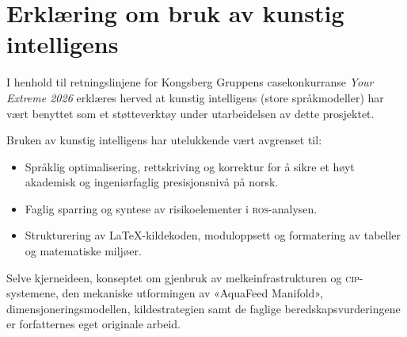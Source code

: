 \section*{Erklæring om bruk av kunstig intelligens}

I henhold til retningslinjene for Kongsberg Gruppens casekonkurranse \textit{Your Extreme 2026} erklæres herved at kunstig intelligens (store språkmodeller) har vært benyttet som et støtteverktøy under utarbeidelsen av dette prosjektet. 

Bruken av kunstig intelligens har utelukkende vært avgrenset til:
\begin{itemize}[leftmargin=1.5em, itemsep=0.2em]
    \item Språklig optimalisering, rettskriving og korrektur for å sikre et høyt akademisk og ingeniørfaglig presisjonsnivå på norsk.
    \item Faglig sparring og syntese av risikoelementer i \textsc{ros}-analysen.
    \item Strukturering av \LaTeX-kildekoden, moduloppsett og formatering av tabeller og matematiske miljøer.
\end{itemize}

Selve kjerneideen, konseptet om gjenbruk av melkeinfrastrukturen og \textsc{cip}-systemene, den mekaniske utformingen av «AquaFeed Manifold», dimensjoneringsmodellen, kildestrategien samt de faglige beredskapsvurderingene er forfatternes eget originale arbeid.
